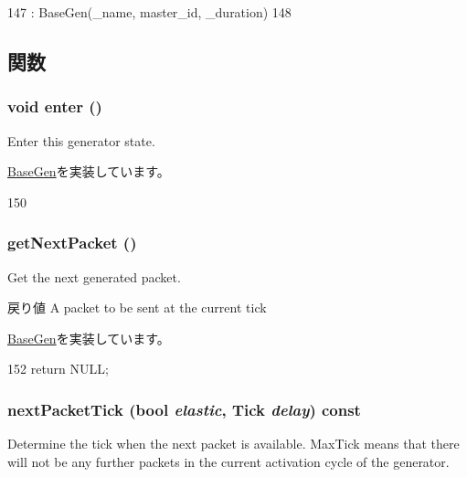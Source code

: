 \begin{DoxyCode}
147         : BaseGen(_name, master_id, _duration)
148     { }
\end{DoxyCode}


\subsection{関数}
\hypertarget{classIdleGen_a2759dad6560aaf485b16356d7142d69d}{
\subsubsection[{enter}]{\setlength{\rightskip}{0pt plus 5cm}void enter ()}}
\label{classIdleGen_a2759dad6560aaf485b16356d7142d69d}
Enter this generator state. 

\hyperlink{classBaseGen_ac51895063c53dfbc0f47a01940a3aa05}{BaseGen}を実装しています。


\begin{DoxyCode}
150 { }
\end{DoxyCode}
\hypertarget{classIdleGen_a938aa9841a9a62a776afbd0768af5379}{
\subsubsection[{getNextPacket}]{ getNextPacket ()}}
\label{classIdleGen_a938aa9841a9a62a776afbd0768af5379}
Get the next generated packet.

\begin{DoxyReturn}{戻り値}
A packet to be sent at the current tick 
\end{DoxyReturn}


\hyperlink{classBaseGen_a6cdb7c977e91dfc33aeea10a3dfcefed}{BaseGen}を実装しています。


\begin{DoxyCode}
152 { return NULL; }
\end{DoxyCode}
\hypertarget{classIdleGen_a65f805b54c24ac3ce0a37716de3e8abc}{
\subsubsection[{nextPacketTick}]{ nextPacketTick (bool {\em elastic}, \/  {\bf Tick} {\em delay}) const}}
\label{classIdleGen_a65f805b54c24ac3ce0a37716de3e8abc}
Determine the tick when the next packet is available. MaxTick means that there will not be any further packets in the current activation cycle of the generator.


